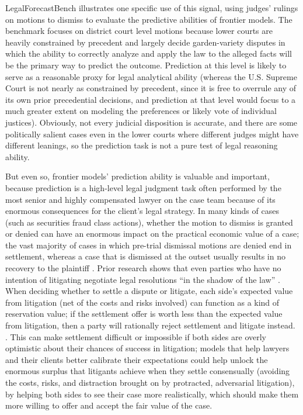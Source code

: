\documentclass[11pt]{article}
\begin{document}
LegalForecastBench illustrates one specific use of this signal, using judges' rulings on motions to dismiss to evaluate the predictive abilities of frontier models. The benchmark focuses on district court level motions because lower courts are heavily constrained by precedent and largely decide garden-variety disputes in which the ability to correctly analyze and apply the law to the alleged facts will be the primary way to predict the outcome. Prediction at this level is likely to serve as a reasonable proxy for legal analytical ability (whereas the U.S. Supreme Court is not nearly as constrained by precedent, since it is free to overrule any of its own prior precedential decisions, and prediction at that level would focus to a much greater extent on modeling the preferences or likely vote of individual justices). Obviously, not every judicial disposition is accurate, and there are some politically salient cases even in the lower courts where different judges might have different leanings, so the prediction task is not a pure test of legal reasoning ability.

But even so, frontier models' prediction ability is valuable and important, because prediction is a high-level legal judgment task often performed by the most senior and highly compensated lawyer on the case team because of its enormous consequences for the client's legal strategy. In many kinds of cases (such as securities fraud class actions), whether the motion to dismiss is granted or denied can have an enormous impact on the practical economic value of a case; the vast majority of cases in which pre-trial dismissal motions are denied end in settlement, whereas a case that is dismissed at the outset usually results in no recovery to the plaintiff \citep[p.~16]{securitiesFilings2024}. Prior research shows that even parties who have no intention of litigating negotiate legal resolutions ``in the shadow of the law'' \citep{shadow}. When deciding whether to settle a dispute or litigate, each side's expected value from litigation (net of the costs and risks involved) can function as a kind of reservation value; if the settlement offer is worth less than the expected value from litigation, then a party will rationally reject settlement and litigate instead. \citep{priestklein,settlement}. This can make settlement difficult or impossible if both sides are overly optimistic about their chances of success in litigation; models that help lawyers and their clients better calibrate their expectations could help unlock the enormous surplus that litigants achieve when they settle consensually (avoiding the costs, risks, and distraction brought on by protracted, adversarial litigation), by helping both sides to see their case more realistically, which should make them more willing to offer and accept the fair value of the case.
\end{document}
